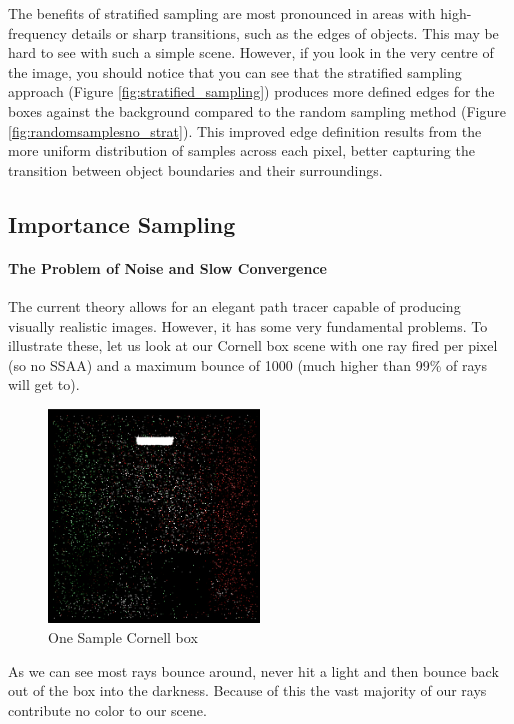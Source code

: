 \documentclass[12pt]{article}
\begin{document}
The benefits of stratified sampling are most pronounced in areas with high-frequency details or sharp transitions, such as the edges of objects. This may be hard to see with such a simple scene. However, if you look in the very centre of the image, you should notice that you can see that the stratified sampling approach (Figure \ref{fig:stratified_sampling}) produces more defined edges for the boxes against the background compared to the random sampling method (Figure \ref{fig:randomsamplesno_strat}). This improved edge definition results from the more uniform distribution of samples across each pixel, better capturing the transition between object boundaries and their surroundings.

\subsection{Importance Sampling}

\paragraph{The Problem of Noise and Slow Convergence} The current theory allows for an elegant path tracer capable of producing visually realistic images. However, it has some very fundamental problems. To illustrate these, let us look at our Cornell box scene with one ray fired per pixel (so no SSAA) and a maximum bounce of 1000 (much higher than 99\% of rays will get to).

\begin{figure}[H]
    \centering
    \includegraphics[width=0.5\textwidth]{images/one_samp/random_sample.png}
    \caption{One Sample Cornell box}
    \label{fig:onesampcornell}
\end{figure}

As we can see most rays bounce around, never hit a light and then bounce back out of the box into the darkness. Because of this the vast majority of our rays contribute no color to our scene.
\end{document}
